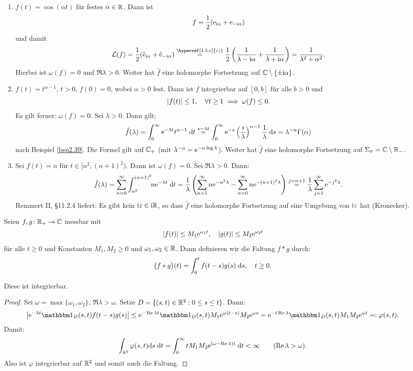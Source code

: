 \documentclass[a4paper,twoside,DIV15,BCOR12mm]{scrbook}
\begin{document}
\begin{bsp}
\begin{enumerate}
\item $f(t) = \cos(\alpha t)$ für festes $\alpha\in\mathbb{R}$. Dann ist
\[f = \frac{1}{2}(\mathrm{e}_{\mathrm{i}\alpha}+\mathrm{e}_{-\mathrm{i}\alpha})\]
und damit
\[\L(f) = \frac{1}{2}(\hat{\e}_{\i\alpha} + \hat{\e}_{-\i\alpha})\overset{\hyperref[4.5:c]{c)}}{=}\frac{1}{2}\left(\frac{1}{\lambda-\i\alpha}+\frac{1}{\lambda+\i\alpha}\right) = \frac{1}{\lambda^2+\alpha^2}.\]
Hierbei ist $\omega(f)=0$ und $\Re{\lambda}>0$. Weiter hat $\hat{f}$ eine holomorphe Fortsetzung auf $\mathbb{C}\setminus\{\pm\mathrm{i}\alpha\}$.

\item $f(t)=t^{\alpha-1}$, $t>0$, $f(0)=0$, wobei $\alpha>0$ fest. Dann ist $f$ integrierbar auf $[0,b]$ für alle $b>0$ und
\[\left\lvert f(t)\right\lvert\leq 1,\quad\forall t\geq 1\implies\omega(f)\leq 0.\]
Es gilt ferner: $\omega(f)=0$. Sei $\lambda>0$. Dann gilt:
\[\hat{f}(\lambda) = \int_{0}^{\infty}{\mathrm{e}^{-\lambda t}t^{\alpha-1}}\;\mathrm{d} t\overset{s=\lambda t}{=}\int_{0}^{\infty}{\mathrm{e}^{-s}\left(\frac{s}{\lambda}\right)^{\alpha-1}\frac{1}{\lambda}}\;\mathrm{d} s = \lambda^{-\alpha}\Gamma(\alpha)\]
nach Beispiel \ref{bsp2.39}. Die Formel gilt auf $\mathbb{C}_+$ (mit $\lambda^{-\alpha}=\mathrm{e}^{-\alpha\log\lambda}$). Weiter hat $\hat{f}$ eine holomorphe Fortsetzung auf $\Sigma_\pi=\mathbb{C}\setminus\mathbb{R}_-$.

\item Sei $f(t)=n$ für $t\in[n^2,(n+1)^2)$. Dann ist $\omega(f)=0$. Sei $\Re{\lambda}>0$. Dann:
\[\hat{f}(\lambda)=\sum_{n=0}^\infty\int_{n^2}^{(n+1)^2}{\!\!n\mathrm{e}^{-\lambda t}}\;\mathrm{d} t = \frac{1}{\lambda}\left(\sum_{n=1}^\infty n\mathrm{e}^{-n^2\lambda}-\sum_{n=0}^\infty n\mathrm{e}^{-(n+1)^2\lambda}\right)\overset{j=n+1}{=}\frac{1}{\lambda}\sum_{j=1}^\infty\mathrm{e}^{-j^2\lambda}.\]
Remmert II, §11.2.4 liefert: Es gibt kein $\mathrm{i} z\in\mathrm{i}\mathbb{R}$, so dass $\hat{f}$ eine holomorphe Fortsetzung auf eine Umgebung von $\mathrm{i} z$ hat (Kronecker).
\end{enumerate}\end{bsp}


Seien $f,g\colon\mathbb{R}_+\to\mathbb{C}$ messbar mit
\[\left\lvert f(t)\right\lvert\leq M_1\mathrm{e}^{\omega_1 t},\quad\left\lvert g(t)\right\lvert\leq M_2\mathrm{e}^{\omega_2 t}\]
für alle $t\geq 0$ und Konstanten $M_1,M_2\geq 0$ und $\omega_1,\omega_2\in\mathbb{R}$. Dann definieren wir die Faltung $f*g$ durch:
\[\bigl(f*g\bigr)(t) = \int_{0}^{t}{f(t-s)g(s)}\;\mathrm{d} s,\quad t\geq 0.\]

Diese ist integrierbar.
\begin{proof}
Sei $\omega=\max\{\omega_1,\omega_2\}$, $\Re{\lambda}>\omega$. Setze $D=\{(s,t)\in\mathbb{R}^2: 0\leq s\leq t\}$. Dann:
\[\abs{\e^{-\lambda t}\charfnkt{D}(s,t)f(t-s)g(s)}\leq\e^{-\Re{\lambda t}}\charfnkt{D}(s,t)M_1\e^{\omega(t-s)}M_2\e^{\omega s} = \e^{-t\Re{\lambda}}\charfnkt{D}(s,t)M_1M_2\e^{\omega t}\ad\varphi(s,t).\]
Damit:
\[\int_{\mathbb{R}^2}^{}{\varphi(s,t)\mathrm{d} s}\;\mathrm{d} t=\int_{0}^{\infty}{tM_1M_2\mathrm{e}^{(\omega-\operatorname{Re}{\lambda})t}}\;\mathrm{d} t<\infty\qquad(\operatorname{Re}{\lambda}>\omega).\]
Also ist $\varphi$ integrierbar auf $\mathbb{R}^2$ und somit auch die Faltung.
\end{proof}
\end{document}
